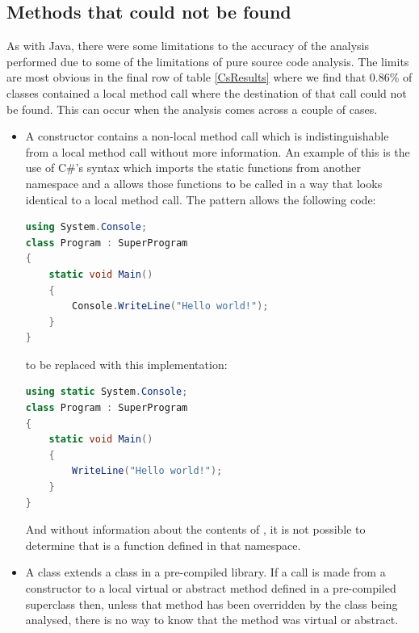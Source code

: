 \subsection{Methods that could not be found}
\label{MethodNotFound}
As with Java, there were some limitations to the accuracy of the analysis performed due to some of the limitations of pure source code analysis. The limits are most obvious in the final row of table \ref{CsResults} where we find that 0.86\% of classes contained a local method call where the destination of that call could not be found. This can occur when the analysis comes across a couple of cases.
\begin{itemize}
	\item A constructor contains a non-local method call which is indistinguishable from a local method call without more information. An example of this is the use of C\#'s  syntax which imports the static functions from another namespace and a allows those functions to be called in a way that looks identical to a local method call. The  pattern allows the following code:
	\begin{lstlisting}[language=cs]
using System.Console;
class Program : SuperProgram
{ 
	static void Main() 
	{ 
		Console.WriteLine("Hello world!"); 
	} 
}
	\end{lstlisting}
	to be replaced with this implementation:
	\begin{lstlisting}[language=cs]
using static System.Console;
class Program : SuperProgram
{ 
	static void Main() 
	{ 
		WriteLine("Hello world!"); 
	} 
}
	\end{lstlisting}
	And without information about the contents of , it is not possible to determine that  is a function defined in that namespace.
	\item A class extends a class in a pre-compiled library. If a call is made from a constructor to a local virtual or abstract method defined in a pre-compiled superclass then, unless that method has been overridden by the class being analysed, there is no way to know that the method was virtual or abstract.
\end{itemize}

